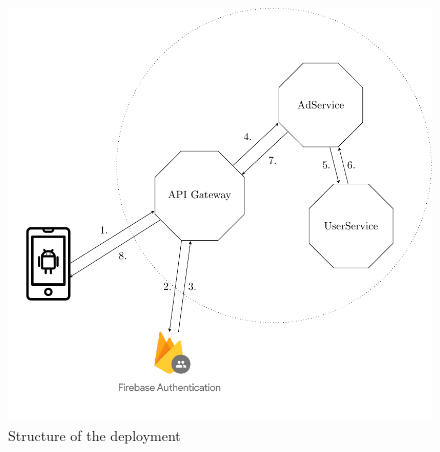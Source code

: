 \begin{figure}
	\centering
	\includegraphics{images/project-structure/TikZ_structure.pdf}
	\caption{Structure of the deployment}
	\label{fig:deployment_structure}
\end{figure}

